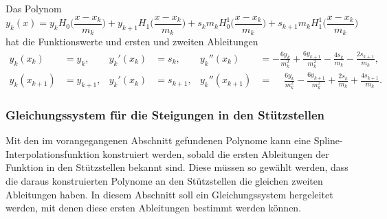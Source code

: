 \begin{satz}
\label{buch:nichtdiff:splines:satz:polynom}
Das Polynom
\begin{equation}
y_k(x)
=
y_k
H_0\biggl(\frac{x-x_k}{m_k}\biggr)
+
y_{k+1}
H_1\biggl(\frac{x-x_k}{m_k}\biggr)
+
s_k
m_k
H_0^1\biggl(\frac{x-x_k}{m_k}\biggr)
+
s_{k+1}
m_{k}
H_1^1\biggl(\frac{x-x_k}{m_k}\biggr)
\label{buch:nichtdiff:splines:eqn:ykdarstellung}
\end{equation}
hat die Funktionswerte und ersten und zweiten Ableitungen
\begin{align*}
y_k(x_k)       &= y_k,
&
y_k'(x_k)      &= s_k,
&
y_k''(x_k)     &=
-\frac{6y_k}{m_k^2} + \frac{6y_{k+1}}{m_k^2}
-
\frac{4s_k}{m_k} - \frac{2s_{k+1}}{m_k},
\\
y_k(x_{k+1})   &= y_{k+1},
&
y_k'(x_k)      &= s_{k+1},
&
y_k''(x_{k+1}) &=
\phantom{-}\frac{6y_k}{m_k^2} - \frac{6y_{k+1}}{m_k^2}
+
\frac{2s_k}{m_k} + \frac{4s_{k+1}}{m_k}.
\end{align*}
\end{satz}

%
%
\subsubsection{Gleichungssystem für die Steigungen in den Stützstellen}
Mit den im vorangegangenen Abschnitt gefundenen Polynome kann eine
Spline-Inter\-po\-la\-tions\-funktion konstruiert werden, sobald die ersten
Ableitungen der Funktion in den Stützstellen bekannt sind.
Diese müssen so gewählt werden, dass die daraus konstruierten
Polynome an den Stützstellen die gleichen zweiten Ableitungen haben.
In diesem Abschnitt soll ein Gleichungssystem hergeleitet werden, mit
denen diese ersten Ableitungen bestimmt werden können.


